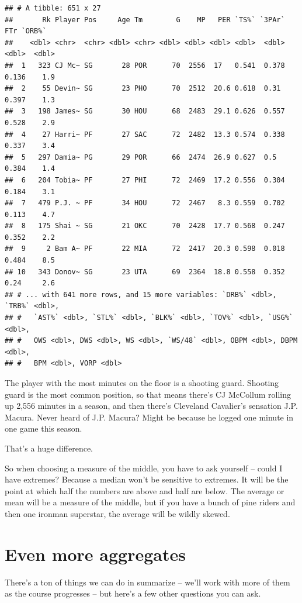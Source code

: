 \documentclass[
]{book}
\begin{document}
\begin{verbatim}
## # A tibble: 651 x 27
##       Rk Player Pos     Age Tm        G    MP   PER `TS%` `3PAr`   FTr `ORB%`
##    <dbl> <chr>  <chr> <dbl> <chr> <dbl> <dbl> <dbl> <dbl>  <dbl> <dbl>  <dbl>
##  1   323 CJ Mc~ SG       28 POR      70  2556  17   0.541  0.378 0.136    1.9
##  2    55 Devin~ SG       23 PHO      70  2512  20.6 0.618  0.31  0.397    1.3
##  3   198 James~ SG       30 HOU      68  2483  29.1 0.626  0.557 0.528    2.9
##  4    27 Harri~ PF       27 SAC      72  2482  13.3 0.574  0.338 0.337    3.4
##  5   297 Damia~ PG       29 POR      66  2474  26.9 0.627  0.5   0.384    1.4
##  6   204 Tobia~ PF       27 PHI      72  2469  17.2 0.556  0.304 0.184    3.1
##  7   479 P.J. ~ PF       34 HOU      72  2467   8.3 0.559  0.702 0.113    4.7
##  8   175 Shai ~ SG       21 OKC      70  2428  17.7 0.568  0.247 0.352    2.2
##  9     2 Bam A~ PF       22 MIA      72  2417  20.3 0.598  0.018 0.484    8.5
## 10   343 Donov~ SG       23 UTA      69  2364  18.8 0.558  0.352 0.24     2.6
## # ... with 641 more rows, and 15 more variables: `DRB%` <dbl>, `TRB%` <dbl>,
## #   `AST%` <dbl>, `STL%` <dbl>, `BLK%` <dbl>, `TOV%` <dbl>, `USG%` <dbl>,
## #   OWS <dbl>, DWS <dbl>, WS <dbl>, `WS/48` <dbl>, OBPM <dbl>, DBPM <dbl>,
## #   BPM <dbl>, VORP <dbl>
\end{verbatim}

The player with the most minutes on the floor is a shooting guard. Shooting guard is the most common position, so that means there's CJ McCollum rolling up 2,556 minutes in a season, and then there's Cleveland Cavalier's sensation J.P. Macura. Never heard of J.P. Macura? Might be because he logged one minute in one game this season.

That's a huge difference.

So when choosing a measure of the middle, you have to ask yourself -- could I have extremes? Because a median won't be sensitive to extremes. It will be the point at which half the numbers are above and half are below. The average or mean will be a measure of the middle, but if you have a bunch of pine riders and then one ironman superstar, the average will be wildly skewed.

\hypertarget{even-more-aggregates}{%
\section{Even more aggregates}\label{even-more-aggregates}}

There's a ton of things we can do in summarize -- we'll work with more of them as the course progresses -- but here's a few other questions you can ask.
\end{document}

